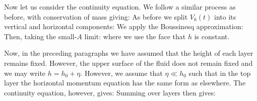 \documentclass[10pt]{article}
\begin{document}
Now let us consider the continuity equation. We follow a similar process as before, with conservation of mass giving:
As before we split $V_{k}(t)$ into its vertical and horizontal components:
We apply the Boussinesq approximation:
Then, taking the small-$A$ limit:
where we use the face that $h$ is constant. \\
\linebreak
\iffalse
Now if we take \cref{eq:infinitessimalmomeq} and ignore the averaging overbars, then we can combine it with the continuity equation to obtain:
\eqnn{
	\PD{\B{u}}{t}  + \B{u}\cdot\nabla\B{u} +  \Half\lrsq{(w \pr_{z}\B{u})_{+} + (w \pr_{z}\b{u})_{-}}   + f e_{3}\times \B{u}  +  \frac{1}{\rho_{0}}\nabla p = 0
}
Where we define $(\pr_{z}\B{u})_{\pm} : = \frac{2}{h}\lrsq{\B{u}_{\pm} - \B{u}}$.\\
\linebreak
\fi
Now, in the preceding paragraphs we have assumed that the height of each layer remains fixed. However, the upper surface of the fluid does not remain fixed and we may write $h = h_{0} + \eta$. However, we assume that $\eta \ll  h_{0}$ such that in the top layer the horizontal momentum equation has the same form as elsewhere. The continuity equation, however, gives:
Summing over layers then gives:
\end{document}
